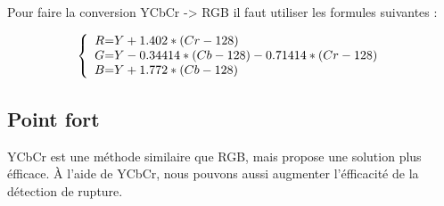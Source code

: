 Pour faire la conversion YCbCr -> RGB il faut utiliser les formules suivantes :

\[
 \left \{
 \begin{array}{c @{=} l}
	R & Y + 1.402 * (Cr - 128) \\
	G & Y - 0.34414 * (Cb - 128) - 0.71414 * (Cr - 128) \\
	B & Y + 1.772 * (Cb - 128) \\
 \end{array}
 \right.
\]


\subsection{Point fort}
YCbCr est une méthode similaire que RGB, mais propose une solution plus éfficace. À l’aide de YCbCr, nous pouvons aussi augmenter l’éfficacité de la détection de rupture.
